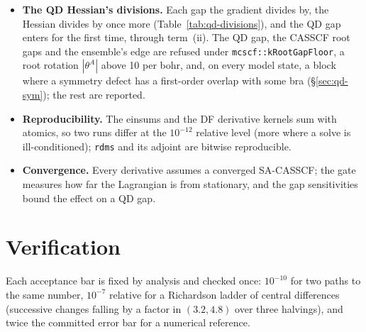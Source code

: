 \documentclass[11pt]{article}
\newcommand{\code}[1]{\texttt{#1}}
\begin{document}
\begin{itemize}
  state form, the coupling and the NAC (not by the W forms or the
  intersection); CASSCF roots closer than that which $\zeta$, $t$ or
  $T^{PQ}$ couple are refused, except PC's intersection inside the QD
  pair's own CASSCF pair, which returns the mean gradient alone
  (\S\ref{sec:meci}).
\item \textbf{The QD Hessian's divisions.} Each gap the gradient divides
  by, the Hessian divides by once more (Table~\ref{tab:qd-divisions}), and
  the QD gap enters for the first time, through term~(ii). The QD gap, the
  CASSCF root gaps and the ensemble's edge are refused under
  \code{mcscf::kRootGapFloor}, a root rotation $|\theta^A|$ above 10 per
  bohr, and, on every model state, a block where a symmetry defect has a
  first-order overlap with some bra (\S\ref{sec:qd-sym}); the rest are
  reported.
\item \textbf{Reproducibility.} The einsums and the DF derivative kernels sum
  with atomics, so two runs differ at the $10^{-12}$ relative level (more
  where a solve is ill-conditioned); \code{rdms} and its adjoint are
  bitwise reproducible.
\item \textbf{Convergence.} Every derivative assumes a converged SA-CASSCF;
  the gate measures how far the Lagrangian is from stationary, and the gap
  sensitivities bound the effect on a QD gap.
\end{itemize}

\section{Verification}
\label{sec:verification}

Each acceptance bar is fixed by analysis and checked once: $10^{-10}$ for
two paths to the same number, $10^{-7}$ relative for a Richardson ladder of
central differences (successive changes falling by a factor in $(3.2, 4.8)$
over three halvings), and twice the committed error bar for a numerical
reference.
\end{document}
